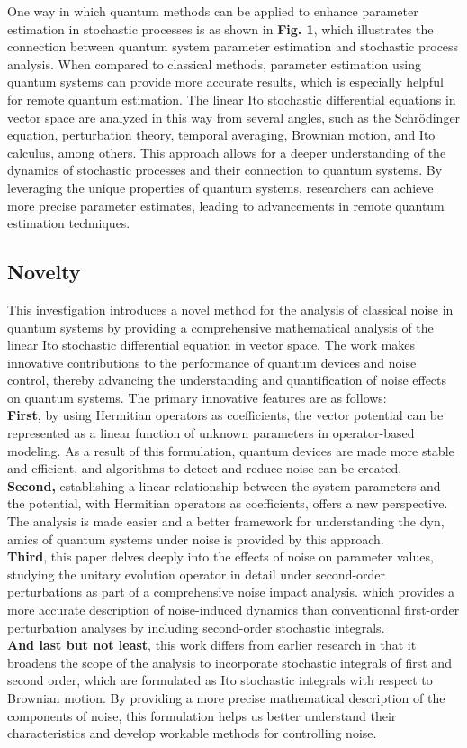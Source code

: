 \documentclass[journal,twocolumn]{IEEEtran}
\begin{document}
One way in which quantum methods can be applied to enhance parameter estimation in stochastic processes is as shown in \textbf{Fig. 1}, which illustrates the connection between quantum system parameter estimation and stochastic process analysis. When compared to classical methods, parameter estimation using quantum systems can provide more accurate results, which is especially helpful for remote quantum estimation. The linear Ito stochastic differential equations in vector space are analyzed in this way from several angles, such as the Schrödinger equation, perturbation theory, temporal averaging, Brownian motion, and Ito calculus, among others. This approach allows for a deeper understanding of the dynamics of stochastic processes and their connection to quantum systems. By leveraging the unique properties of quantum systems, researchers can achieve more precise parameter estimates, leading to advancements in remote quantum estimation techniques.
\subsection{Novelty}
This investigation introduces a novel method for the analysis of classical noise in quantum systems by providing a comprehensive mathematical analysis of the linear Ito stochastic differential equation in vector space. The work makes innovative contributions to the performance of quantum devices and noise control, thereby advancing the understanding and quantification of noise effects on quantum systems. The primary innovative features are as follows:\\
\textbf{First}, by using Hermitian operators as coefficients, the vector potential can be represented as a linear function of unknown parameters in operator-based modeling. As a result of this formulation, quantum devices are made more stable and efficient, and algorithms to detect and reduce noise can be created.
\\
\textbf{Second,} establishing a linear relationship between the system parameters and the potential, with Hermitian operators as coefficients, offers a new perspective. The analysis is made easier and a better framework for understanding the dyn, amics of quantum systems under noise is provided by this approach.
\\
\textbf{Third}, this paper delves deeply into the effects of noise on parameter values, studying the unitary evolution operator in detail under second-order perturbations as part of a comprehensive noise impact analysis. which provides a more accurate description of noise-induced dynamics than conventional first-order perturbation analyses by including second-order stochastic integrals. \\
\textbf{And last but not least}, this work differs from earlier research in that it broadens the scope of the analysis to incorporate stochastic integrals of first and second order, which are formulated as Ito stochastic integrals with respect to Brownian motion. By providing a more precise mathematical description of the components of noise, this formulation helps us better understand their characteristics and develop workable methods for controlling noise.
\end{document}
